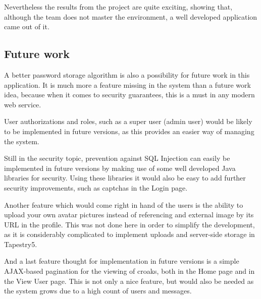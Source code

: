\documentclass[paper=a4, fontsize=12pt]{scrartcl}
\numberwithin{equation}{section}    %
\numberwithin{figure}{section}      %
\numberwithin{table}{section}        %
\begin{document}
Nevertheless the results from the project are quite exciting, showing that, although the team
does not master the environment, a well developed application came out of it.

\subsection{Future work}
A better password storage algorithm is also a possibility for future work in this application.
It is much more a feature missing in the system than a future work idea, because when it comes
to security guarantees, this is a must in any modern web service.

User authorizations and roles, such as a super user (admin user) would be likely to be
implemented in future versions, as this provides an easier way of managing the system.

Still in the security topic, prevention against SQL Injection can easily be implemented
in future versions by making use of some well developed Java libraries for security.
Using these libraries it would also be easy to add further security improvements,
such as captchas in the Login page.

Another feature which would come right in hand of the users is the ability to upload your own avatar pictures
instead of referencing and external image by its URL in the profile. This was not done here in order to simplify the development, as it
is considerably complicated to implement uploads and server-side storage in Tapestry5.

And a last feature thought for implementation in future versions is a simple AJAX-based
pagination for the viewing of croaks, both in the Home page and in the View User page.
This is not only a nice feature, but would also be needed as the system grows due to
a high count of users and messages.

\end{document}
